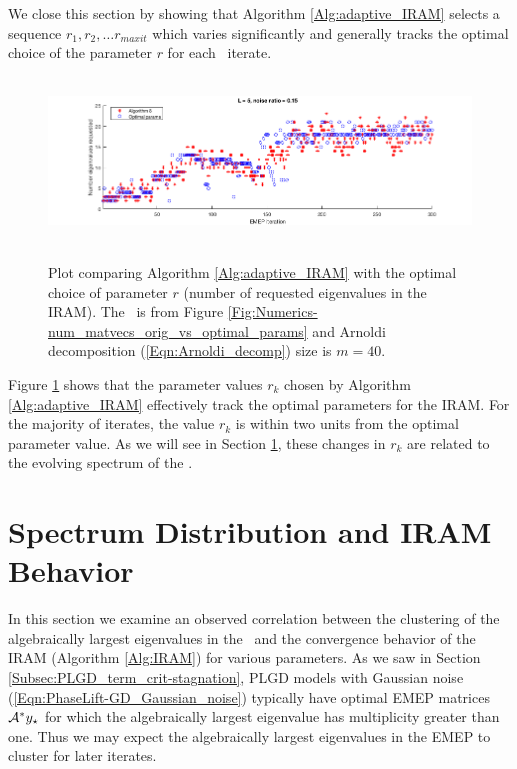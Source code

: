 We close this section by showing that Algorithm \ref{Alg:adaptive_IRAM} selects a sequence $r_1, r_2, \ldots r_{maxit}$ which varies significantly and generally tracks the optimal choice of the parameter $r$ for each \emep \ iterate.

\begin{figure}[H]
\centering
\hbox{\hspace{-1.8cm} \includegraphics[scale=0.6]{Numerics-num_eigs_ada_vs_opt_1} }\vspace{0.6cm}
\vspace{0.2cm}
	\caption{
	Plot comparing Algorithm \ref{Alg:adaptive_IRAM} with the optimal choice of parameter $r$ (number of requested eigenvalues in the IRAM).
	 The \emep \ is from Figure \ref{Fig:Numerics-num_matvecs_orig_vs_optimal_params} and Arnoldi decomposition (\ref{Eqn:Arnoldi_decomp}) size is $m=40$.
	}
\label{Fig:Numerics-num_eigs_ada_vs_opt_one_plot}
\end{figure}

Figure \ref{Fig:Numerics-num_eigs_ada_vs_opt_one_plot} shows that the parameter values $r_k$ chosen by Algorithm \ref{Alg:adaptive_IRAM} effectively track the optimal parameters for the IRAM.  
For the majority of iterates, the value $r_k$ is within two units from the optimal parameter value.
As we will see in Section \ref{Subsec:evol_mats-correl_btwn_EMEP_and_IRAM}, these changes in $r_k$ are related to the evolving spectrum of the \emep.




 


\section{Spectrum Distribution and IRAM Behavior}
\label{Subsec:evol_mats-correl_btwn_EMEP_and_IRAM}



In this section we examine an observed correlation between the clustering of the algebraically largest eigenvalues in the \emep \ and the convergence behavior of the IRAM (Algorithm \ref{Alg:IRAM}) for various parameters.
As we saw in Section \ref{Subsec:PLGD_term_crit-stagnation}, PLGD models with Gaussian noise (\ref{Eqn:PhaseLift-GD_Gaussian_noise}) typically have optimal EMEP matrices ${\mathcal A}^*y_\star$ for which the algebraically largest eigenvalue has multiplicity greater than one.
Thus we may expect the algebraically largest eigenvalues in the EMEP to cluster for later iterates.

